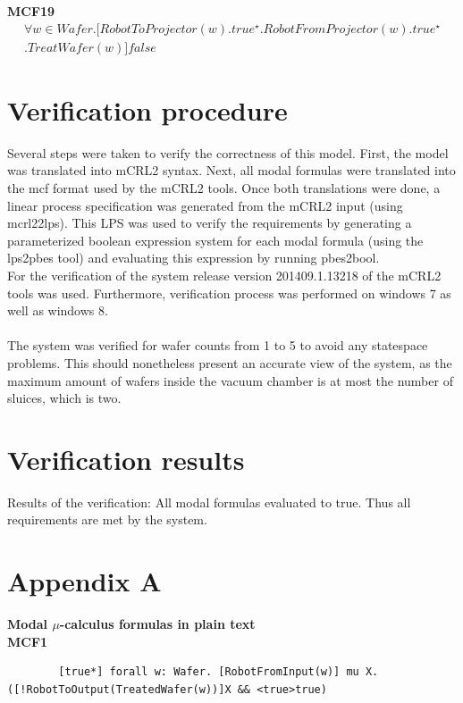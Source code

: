 \documentclass[12pt]{report}
\begin{document}
    \textbf{MCF19}
    \begin{multline*}
        [true^{\star}] \forall w \in Wafer. [RobotToProjector(w).true^{\star}.RobotFromProjector(w).true^{\star} \\
        .TreatWafer(w)]false
    \end{multline*}

	\section{Verification procedure}
	Several steps were taken to verify the correctness of this model. First, the model was translated into mCRL2 syntax. Next, all modal formulas were translated into the mcf format used by the mCRL2 tools. Once both translations were done, a linear process specification was generated from the mCRL2 input (using mcrl22lps). This LPS was used to verify the requirements by generating a parameterized boolean expression system for each modal formula (using the lps2pbes tool) and evaluating this expression by running pbes2bool.\\
	For the verification of the system release version 201409.1.13218 of the mCRL2 tools was used. Furthermore, verification process was performed on windows 7 as well as windows 8. \\
	\\
	The system was verified for wafer counts from 1 to 5 to avoid any statespace problems. This should nonetheless present an accurate view of the system, as the maximum amount of wafers inside the vacuum chamber is at most the number of sluices, which is two.
	
	\section{Verification results}
	Results of the verification: All modal formulas evaluated to true. Thus all requirements are met by the system.
	
	\section{Appendix A}
	\textbf{Modal $\mu$-calculus formulas in plain text}\\

    \textbf{MCF1}
    \begin{lstlisting}
    	[true*] forall w: Wafer. [RobotFromInput(w)] mu X. ([!RobotToOutput(TreatedWafer(w))]X && <true>true)
    \end{lstlisting}
\end{document}

